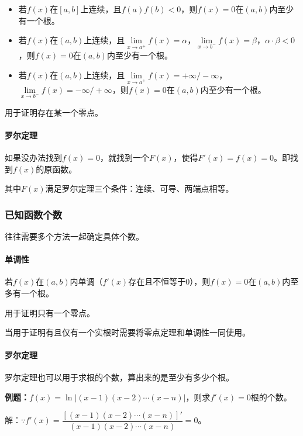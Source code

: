 \begin{itemize}
    \item 若$f(x)$在$[a,b]$上连续，且$f(a)f(b)<0$，则$f(x)=0$在$(a,b)$内至少有一个根。
    \item 若$f(x)$在$(a,b)$上连续，且$\lim\limits_{x\to a^+}f(x)=\alpha$，$\lim\limits_{x\to b^-}f(x)=\beta$，$\alpha\cdot\beta<0$，则$f(x)=0$在$(a,b)$内至少有一个根。
    \item 若$f(x)$在$(a,b)$上连续，且$\lim\limits_{x\to a^+}f(x)=+\infty/-\infty$，$\lim\limits_{x\to b^-}f(x)=-\infty/+\infty$，则$f(x)=0$在$(a,b)$内至少有一个根。
\end{itemize}

用于证明存在某一个零点。

\paragraph{罗尔定理} \leavevmode \medskip

如果没办法找到$f(x)=0$，就找到一个$F(x)$，使得$F'(x)=f(x)=0$。即找到$f(x)$的原函数。

其中$F(x)$满足罗尔定理三个条件：连续、可导、两端点相等。

\subsubsection{已知函数个数}

往往需要多个方法一起确定具体个数。

\paragraph{单调性} \leavevmode \medskip

若$f(x)$在$(a,b)$内单调（$f'(x)$存在且不恒等于0），则$f(x)=0$在$(a,b)$内至多有一个根。

用于证明只有一个零点。

当用于证明有且仅有一个实根时需要将零点定理和单调性一同使用。

\paragraph{罗尔定理} \leavevmode \medskip

罗尔定理也可以用于求根的个数，算出来的是至少有多少个根。

\textbf{例题：}$f(x)=\ln\vert(x-1)(x-2)\cdots(x-n)\vert$，则求$f'(x)=0$根的个数。

解：$\because f'(x)=\dfrac{[(x-1)(x-2)\cdots(x-n)]'}{(x-1)(x-2)\cdots(x-n)}=0$。

